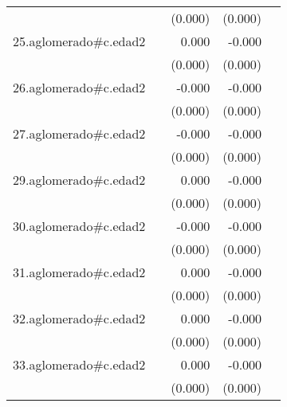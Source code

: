 {\begin{longtable}{l*{4}{D{.}{.}{-1}}}
            &                     &     (0.000)         &     (0.000)         &                     \\
\addlinespace
25.aglomerado#c.edad2&                     &       0.000         &      -0.000         &                     \\
            &                     &     (0.000)         &     (0.000)         &                     \\
\addlinespace
26.aglomerado#c.edad2&                     &      -0.000         &      -0.000         &                     \\
            &                     &     (0.000)         &     (0.000)         &                     \\
\addlinespace
27.aglomerado#c.edad2&                     &      -0.000         &      -0.000         &                     \\
            &                     &     (0.000)         &     (0.000)         &                     \\
\addlinespace
29.aglomerado#c.edad2&                     &       0.000         &      -0.000         &                     \\
            &                     &     (0.000)         &     (0.000)         &                     \\
\addlinespace
30.aglomerado#c.edad2&                     &      -0.000         &      -0.000\sym{*}  &                     \\
            &                     &     (0.000)         &     (0.000)         &                     \\
\addlinespace
31.aglomerado#c.edad2&                     &       0.000         &      -0.000         &                     \\
            &                     &     (0.000)         &     (0.000)         &                     \\
\addlinespace
32.aglomerado#c.edad2&                     &       0.000         &      -0.000         &                     \\
            &                     &     (0.000)         &     (0.000)         &                     \\
\addlinespace
33.aglomerado#c.edad2&                     &       0.000         &      -0.000         &                     \\
            &                     &     (0.000)         &     (0.000)         &                     \\

\end{longtable}}

